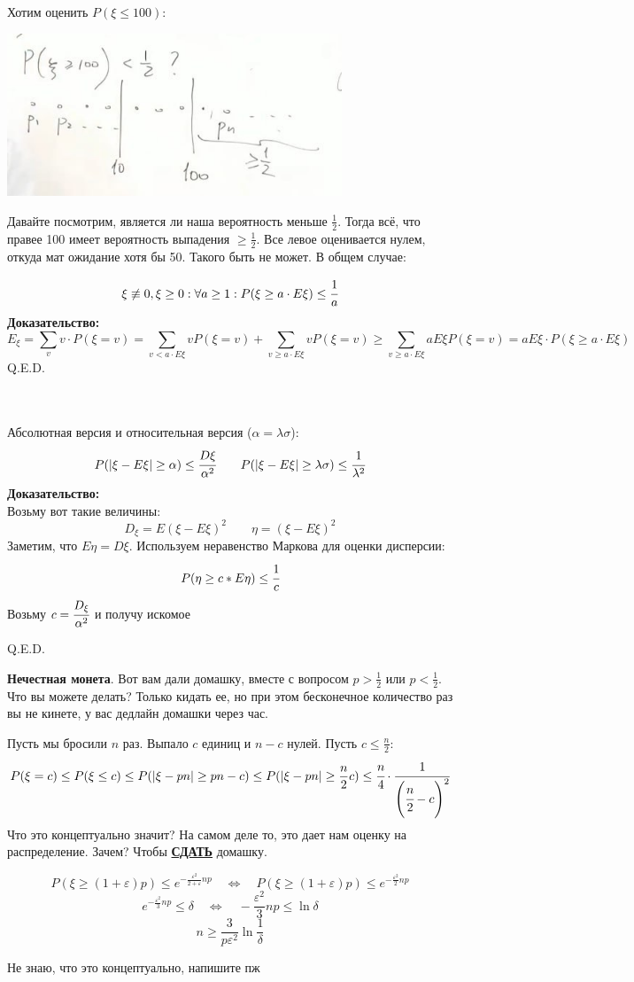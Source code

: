 Хотим оценить $P(\xi\leq 100)$:
\begin{center}
    \includegraphics[width = 10cm]{assets/3_3_1.jpg}
\end{center}

Давайте посмотрим, является ли наша вероятность меньше $\frac 1 2$. Тогда всё, что правее 100 имеет вероятность выпадения $\geq \frac1 2 $. Все левое оценивается нулем, откуда мат ожидание хотя бы 50. Такого быть не может. В общем случае:

$$\xi\not \equiv0,\xi\geq 0: \forall a\geq 1: P(\xi\geq a \cdot E\xi) \leq \cfrac{1}{a}$$
\textbf{Доказательство:}
$$E_{\xi} = \sum\limits_{v}v \cdot P(\xi = v) = \sum\limits_{v < a \cdot E\xi} v P(\xi = v)+ \sum\limits_{v\geq a\cdot E\xi} v P(\xi=v)\geq \sum\limits_{v\geq a\cdot E\xi} a E{\xi} P(\xi=v) = a E{\xi}\cdot P (\xi\geq a\cdot E{\xi})$$
\hfill Q.E.D.

 \\  \\
Абсолютная версия и относительная версия ($\alpha = \lambda\sigma$):
$$P(|\xi-E\xi|\geq \alpha)\leq \cfrac{D\xi}{\alpha^2} \quad \quad P(|\xi-E\xi|\geq \lambda\sigma)\leq \cfrac{1}{\lambda^2}$$
\textbf{Доказательство:}\\
Возьму вот такие величины:
$$D_{\xi} = E(\xi-E\xi)^2\quad \quad  \eta = (\xi-E\xi)^2$$
Заметим, что $E\eta=D\xi$. Используем неравенство Маркова для оценки дисперсии:
$$P(\eta\geq c*E\eta)\leq \cfrac{1}{c}$$
Возьму $c= \cfrac{D_{\xi}}{\alpha^2}$ и получу искомое

\hfill Q.E.D.

\textbf{Нечестная монета}. Вот вам дали домашку, вместе  с вопросом $p>\frac{1}{2}$ или $p<\frac{1}{2}$. Что вы можете делать? Только кидать ее, но при этом бесконечное количество раз вы не кинете, у вас дедлайн домашки через час. 

Пусть мы бросили $n$ раз. Выпало $c$ единиц и $n-c$ нулей. Пусть $c\le \frac{n}{2}$:
$$P(\xi = c)\leq P(\xi\leq c)\leq P(|\xi-pn|\geq pn-c)\leq  P(|\xi-pn|\geq \frac n 2 c)\leq \cfrac{n}{4}\cdot \cfrac{1}{\left(\cfrac{n}{2}-c\right)^2}$$
Что это концептуально значит? На самом деле то, это дает нам оценку на распределение. Зачем? Чтобы \textbf{\uline{СДАТЬ}} домашку.

$$P(\xi\geq (1+\varepsilon)p)\leq e^{-\frac{\varepsilon^2}{2+\varepsilon}np} \quad \Leftrightarrow\quad P(\xi\geq (1+\varepsilon)p)\leq e^{-\frac{\varepsilon^2}{2}np}$$
$$e^{-\frac{\varepsilon^2}{3}np}\leq \delta\quad \Leftrightarrow\quad -\dfrac{\varepsilon^2}{3}np\leq \ln{\delta}$$
$$n\geq \frac{3}{p\varepsilon^2}\ln{\frac{1}{\delta}}$$

Не знаю, что это концептуально, напишите пж